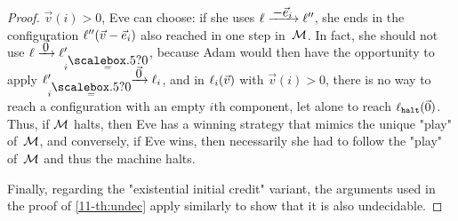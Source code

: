 \begin{proof}
  $\vec v(i)>0$, Eve can choose: if she uses
  $\loc\step{-\vec e_i}\loc''$, she ends in the configuration
  $\ell''(\vec v-\vec e_i)$ also reached in one step in~$\mathcal M$.  In
  fact, she should not use $\loc\step{\vec 0}\loc'_{i\eqby{?0}}$,
  because Adam would then have the opportunity to apply
  $\loc'_{i\eqby{?0}}\!\!\step{\vec 0}\loc_{i}$, and in
  $\ell_{i}(\vec v)$ with $\vec v(i)>0$, there is no way to
  reach a configuration with an empty $i$th component, let alone to
  reach $\ell_\mathtt{halt}(\vec 0)$.  Thus, if $\mathcal M$ halts, then Eve 
  has a winning strategy that mimics the unique "play"
  of~$\mathcal M$, and conversely, if Eve wins, then necessarily she had to
  follow the "play" of~$\mathcal M$ and thus the machine halts.

  \medskip Finally, regarding the "existential initial credit"
  variant, the arguments used in the proof of \cref{11-th:undec} apply
  similarly to show that it is also undecidable.
\end{proof}

